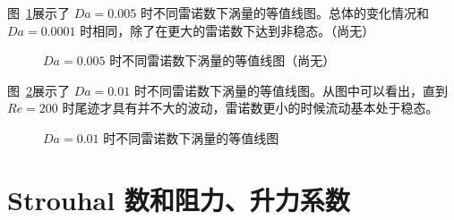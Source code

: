 图~\ref{fig: vorticity-contour-5e-3}展示了 $Da=0.005$ 时不同雷诺数下涡量的等值线图。总体的变化情况和 $Da=0.0001$ 时相同，除了在更大的雷诺数下达到非稳态。（尚无）

\begin{figure}
	\centering
	\begin{minipage}{\textwidth}
		\centering
	\end{minipage}
	\centering
	\begin{minipage}{\textwidth}
		\centering
	\end{minipage}
	\centering
	\begin{minipage}{\textwidth}
		\centering
	\end{minipage}
	\caption{$Da=0.005$ 时不同雷诺数下涡量的等值线图（尚无）}
	\label{fig: vorticity-contour-5e-3}
\end{figure}

图~\ref{fig: vorticity-contour-1e-2}展示了 $Da=0.01$ 时不同雷诺数下涡量的等值线图。从图中可以看出，直到 $Re=200$ 时尾迹才具有并不大的波动，雷诺数更小的时候流动基本处于稳态。

\begin{figure}
	\centering
	\begin{minipage}{\textwidth}
		\centering
	\end{minipage}
	\centering
	\begin{minipage}{\textwidth}
		\centering
	\end{minipage}
	\caption{$Da=0.01$ 时不同雷诺数下涡量的等值线图}
	\label{fig: vorticity-contour-1e-2}
\end{figure}

\section{Strouhal 数和阻力、升力系数}\label{sec: stcdcl}


